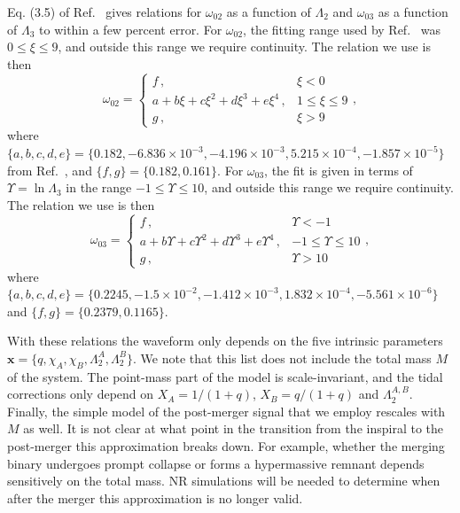 \documentclass[prd,aps,letter,twocolumn,floatfix,notitlepage,nofootinbib]{revtex4-1}
\def\bx{\mathbf{x}}
\begin{document}
Eq. (3.5) of Ref.~\cite{Chan:2014kua} gives relations for $\omega_{02}$ as a function of $\Lambda_2$ and $\omega_{03}$ as a function of $\Lambda_3$ to within a few percent error. For $\omega_{02}$, the fitting range used by Ref.~\cite{Chan:2014kua} was $0\leq \xi \leq 9$, and outside this range we require continuity. The relation we use is then
\begin{equation}
\omega_{02} = \left\{\begin{array}{ll}
f\, , & \xi < 0 \\
a + b\xi + c\xi^2 + d\xi^3 + e\xi^4\, , & 1 \le \xi \le 9 \\
g\, , & \xi > 9
\end{array}\right.,
\end{equation}
where $\{a, b, c, d, e\} = \{0.182, -6.836\times10^{-3}, -4.196\times10^{-3}, 5.215\times10^{-4}, -1.857\times10^{-5}\}$ from Ref.~\cite{Chan:2014kua}, and $\{f, g\}=\{0.182, 0.161\}$. For $\omega_{03}$, the fit is given in terms of $\Upsilon=\ln\Lambda_3$ in the range $-1\leq \Upsilon \leq 10$, and outside this range we require continuity. The relation we use is then
\begin{equation}
\omega_{03} = \left\{\begin{array}{ll}
f\, , & \Upsilon < -1 \\
a + b\Upsilon + c\Upsilon^2 + d\Upsilon^3 + e\Upsilon^4\, , & -1 \le \Upsilon \le 10 \\
g\, , & \Upsilon > 10
\end{array}\right.,
\end{equation}
where $\{a, b, c, d, e\} = \{0.2245, -1.5\times10^{-2}, -1.412\times10^{-3}, 1.832\times10^{-4}, -5.561\times10^{-6}\}$ and $\{f, g\}=\{0.2379, 0.1165\}$.

With these relations the waveform only depends on the five intrinsic parameters $\bx=\{q, \chi_A, \chi_B, \Lambda_2^A,\Lambda_2^B\}$. 
We note that this list does not include the total mass $M$ of the system. The point-mass part of the model is scale-invariant, and the tidal corrections only depend on $X_A=1/(1+q)$, $X_B=q/(1+q)$ and $\Lambda_2^{A,B}$. Finally, the simple model of the post-merger signal that we employ rescales with $M$ as well. It is not clear at what point in the transition from the inspiral to the post-merger this approximation breaks down. For example, whether the merging binary undergoes prompt collapse or forms a hypermassive remnant depends sensitively on the total mass. NR simulations will be needed to determine when after the merger this approximation is no longer valid.
\end{document}
